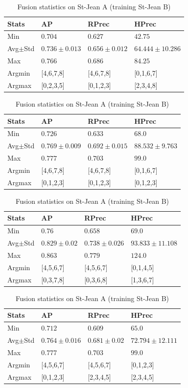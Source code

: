 \begin{table}
  \centering
  \caption{Fusion statistics on St-Jean A (training St-Jean B)}
  \label{tab:fusion_stats_A_B}

  \begin{tabular}{l l l l}
    \toprule
    Stats
    & AP
    & RPrec
    & HPrec \\
    \midrule
    Min & $0.704$ & $0.627$ & $42.75$ \\
    Avg$\pm$Std & $0.736\pm0.013$ & $0.656\pm0.012$ & $64.444\pm10.286$ \\
    Max & $0.766$ & $0.686$ & $84.25$ \\
    Argmin & [4,6,7,8] & [4,6,7,8] & [0,1,6,7] \\
    Argmax & [0,2,3,5] & [0,1,2,3] & [2,3,4,8] \\
    \bottomrule
  \end{tabular}

  \begin{tabular}{l l l l}
    \toprule
    Stats
    & AP
    & RPrec
    & HPrec \\
    \midrule
    Min & $0.726$ & $0.633$ & $68.0$ \\
    Avg$\pm$Std & $0.769\pm0.009$ & $0.692\pm0.015$ & $88.532\pm9.763$ \\
    Max & $0.777$ & $0.703$ & $99.0$ \\
    Argmin & [4,6,7,8] & [4,6,7,8] & [0,1,6,7] \\
    Argmax & [0,1,2,3] & [0,1,2,3] & [0,1,2,3] \\
    \bottomrule
  \end{tabular}

  \begin{tabular}{l l l l}
    \toprule
    Stats
    & AP
    & RPrec
    & HPrec \\
    \midrule
    Min & $0.76$ & $0.658$ & $69.0$ \\
    Avg$\pm$Std & $0.829\pm0.02$ & $0.738\pm0.026$ & $93.833\pm11.108$ \\
    Max & $0.863$ & $0.779$ & $124.0$ \\
    Argmin & [4,5,6,7] & [4,5,6,7] & [0,1,4,5] \\
    Argmax & [0,3,7,8] & [0,3,6,8] & [1,3,6,7] \\
    \bottomrule
  \end{tabular}

  \begin{tabular}{l l l l}
    \toprule
    Stats
    & AP
    & RPrec
    & HPrec \\
    \midrule
    Min & $0.712$ & $0.609$ & $65.0$ \\
    Avg$\pm$Std & $0.764\pm0.016$ & $0.681\pm0.02$ & $72.794\pm12.111$ \\
    Max & $0.777$ & $0.703$ & $99.0$ \\
    Argmin & [4,5,6,7] & [4,5,6,7] & [0,1,2,3] \\
    Argmax & [0,1,2,3] & [2,3,4,5] & [2,3,4,5] \\
    \bottomrule
  \end{tabular}
\end{table}

